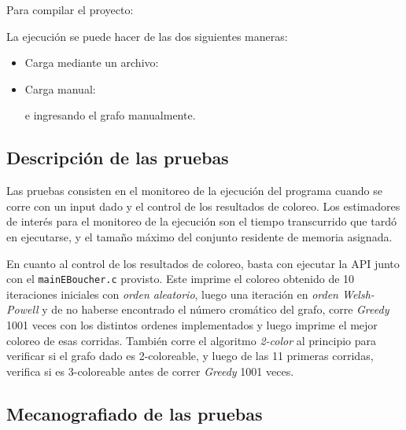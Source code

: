 \documentclass[11pt,a4paper]{article}
\theoremstyle{plain}
\begin{document}
Para compilar el proyecto:
\begin{quote}
\end{quote}

La ejecución se puede hacer de las dos siguientes maneras:
\begin{itemize}
\item{Carga mediante un archivo:
\begin{quote}
\end{quote}}

\item{Carga manual:
\begin{quote}
\end{quote}
 e ingresando el grafo manualmente.
}
\end{itemize}
	
	\subsection{Descripción de las pruebas}
	
Las pruebas consisten en el monitoreo de la ejecución del programa cuando se corre con un input dado y el control de los resultados de coloreo. Los estimadores de interés para el monitoreo de la ejecución son el tiempo transcurrido que tardó en ejecutarse, y el tamaño máximo del conjunto residente de memoria asignada.

En cuanto al control de los resultados de coloreo, basta con ejecutar la API junto con el \texttt{mainEBoucher.c} provisto. Este imprime el coloreo obtenido de 10 iteraciones iniciales con \emph{orden aleatorio}, luego una iteración en \emph{orden Welsh-Powell} y de no haberse encontrado el número cromático del grafo, corre \emph{Greedy} 1001 veces con los distintos ordenes implementados y luego imprime el mejor coloreo de esas corridas. También corre el algoritmo \emph{2-color} al principio para verificar si el grafo dado es 2-coloreable, y luego de las 11 primeras corridas, verifica si es 3-coloreable antes de correr \emph{Greedy} 1001 veces.
	
	\subsection{Mecanografiado de las pruebas}
\end{document}
